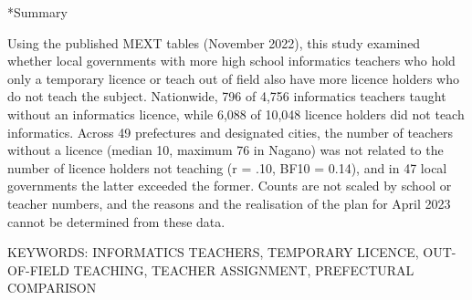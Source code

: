 \documentclass[a4paper,10pt,twocolumn]{ltjsarticle}
\makeatletter
\renewcommand{\section}{\@startsection{section}{1}{\z@}{1.1\Cvs \@plus.4\Cdp \@minus.2\Cdp}{.5\Cvs \@plus.2\Cdp}{\normalfont\gtfamily\bfseries\large}}
\makeatother
\begin{document}
\section*{Summary}
{\footnotesize\setlength{\parindent}{0pt}Using the published MEXT tables (November 2022), this study examined whether local governments with more high school informatics teachers who hold only a temporary licence or teach out of field also have more licence holders who do not teach the subject. Nationwide, 796 of 4,756 informatics teachers taught without an informatics licence, while 6,088 of 10,048 licence holders did not teach informatics. Across 49 prefectures and designated cities, the number of teachers without a licence (median 10, maximum 76 in Nagano) was not related to the number of licence holders not teaching (r = .10, BF10 = 0.14), and in 47 local governments the latter exceeded the former. Counts are not scaled by school or teacher numbers, and the reasons and the realisation of the plan for April 2023 cannot be determined from these data.\par\smallskip KEYWORDS: INFORMATICS TEACHERS, TEMPORARY LICENCE, OUT-OF-FIELD TEACHING, TEACHER ASSIGNMENT, PREFECTURAL COMPARISON\par}
\medskip\noindent{}
\end{document}
